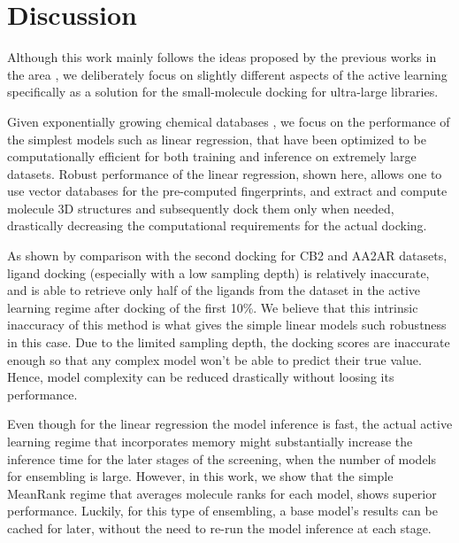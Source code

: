 \section{Discussion}

Although this work mainly follows the ideas proposed by the previous works in the area \cite{deepdocking, logistic_regression, Yang2021_shoichet_active_learning, Graff2021AcceleratingLearning}, we deliberately focus on slightly different aspects of the active learning specifically as a solution for the small-molecule docking for ultra-large libraries. 

Given exponentially growing chemical databases \cite{warr_exploration_2022, lyu_modeling_2023}, we focus on the performance of the simplest models such as linear regression, that have been optimized to be computationally efficient for both training and inference on extremely large datasets. Robust performance of the linear regression, shown here, allows one to use vector databases \cite{noauthor_vector_nodate, noauthor_qdrant_nodate, johnson2019_faiss_vector_database} for the pre-computed fingerprints, and extract and compute molecule 3D structures and subsequently dock them only when needed, drastically decreasing the computational requirements for the actual docking.

As shown by comparison with the second docking for CB2 and AA2AR datasets, ligand docking (especially with a low sampling depth) is relatively inaccurate, and is able to retrieve only half of the ligands from the dataset in the active learning regime after docking of the first 10\%. We believe that this intrinsic inaccuracy of this method is what gives the simple linear models such robustness in this case. Due to the limited sampling depth, the docking scores are inaccurate enough so that any complex model won't be able to predict their true value. Hence, model complexity can be reduced drastically without loosing its performance.

Even though for the linear regression the model inference is fast, the actual active learning regime that incorporates memory might substantially increase the inference time for the later stages of the screening, when the number of models for ensembling is large. However, in this work, we show that the simple MeanRank regime that averages molecule ranks for each model, shows superior performance. Luckily, for this type of ensembling, a base model's results can be cached for later, without the need to re-run the model inference at each stage.

